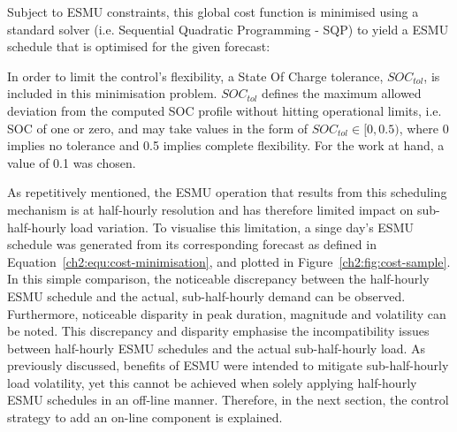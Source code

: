 

Subject to ESMU constraints, this global cost function is minimised using a standard solver (i.e. Sequential Quadratic Programming - SQP) to yield a ESMU schedule that is optimised for the given forecast:



In order to limit the control's flexibility, a State Of Charge tolerance, $SOC_{tol}$, is included in this minimisation problem.
$SOC_{tol}$ defines the maximum allowed deviation from the computed SOC profile without hitting operational limits, i.e. SOC of one or zero, and may take values in the form of $SOC_{tol} \in [0, 0.5)$, where 0 implies no tolerance and 0.5 implies complete flexibility.
For the work at hand, a value of 0.1 was chosen.



As repetitively mentioned, the ESMU operation that results from this scheduling mechanism is at half-hourly resolution and has therefore limited impact on sub-half-hourly load variation.
To visualise this limitation, a singe day's ESMU schedule was generated from its corresponding forecast as defined in Equation~\ref{ch2:equ:cost-minimisation}, and plotted in Figure~\ref{ch2:fig:cost-sample}.
In this simple comparison, the noticeable discrepancy between the half-hourly ESMU schedule and the actual, sub-half-hourly demand can be observed.
Furthermore, noticeable disparity in peak duration, magnitude and volatility can be noted.
This discrepancy and disparity emphasise the incompatibility issues between half-hourly ESMU schedules and the actual sub-half-hourly load.
As previously discussed, benefits of ESMU were intended to mitigate sub-half-hourly load volatility, yet this cannot be achieved when solely applying half-hourly ESMU schedules in an off-line manner.
Therefore, in the next section, the control strategy to add an on-line component is explained.




 